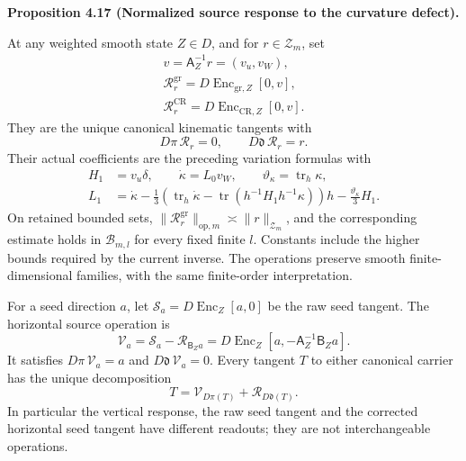 \documentclass[
  english,
  11pt,
  reqno]{amsart}
\makeatletter
\newcommand{\pandocstatementheading}[1]{%
  \par\if@nobreak\else
    \addpenalty{\@beginparpenalty}%
    \addvspace{.5\baselineskip plus .2\baselineskip minus .2\baselineskip}%
  \fi
  {\normalfont\bfseries #1\par}%
  \nobreak\@afterindenttrue\@afterheading
}
\makeatother
\begin{document}
\pandocstatementheading{\leavevmode{}\label{prop:online-source-normalized-vertical-response}Proposition 4.17 (Normalized source response to the curvature defect).}

At any weighted smooth state \(Z\in D\), and for \(r\in\mathcal Z_m\),
set%
 \[
\begin{gathered}
v=\mathsf A_Z^{-1}r=(v_u,v_W), \\
\mathscr R_r^{\mathrm{gr}}
=D\operatorname{Enc}_{\mathrm{gr},Z}[0,v], \\
\mathscr R_r^{\mathrm{CR}}
=D\operatorname{Enc}_{\mathrm{CR},Z}[0,v].
\end{gathered}
\] They are the unique canonical kinematic tangents with%
 \[
D\pi\,\mathscr R_r=0,\qquad
D\mathfrak d\,\mathscr R_r=r.
\] Their actual coefficients are the preceding variation formulas with%
 \[
\begin{aligned}
H_1&=v_u\delta,\qquad \dot\kappa=L_0v_W,
\qquad \vartheta_\kappa=\operatorname{tr}_h\kappa,\\
L_1&=\dot\kappa
-\frac13\left(\operatorname{tr}_h\dot\kappa
-\operatorname{tr}(h^{-1}H_1h^{-1}\kappa)\right)h
-\frac{\vartheta_\kappa}{3}H_1.
\end{aligned}
\] On retained bounded sets,
\(\|\mathscr R_r^{\mathrm{gr}}\|_{\mathrm{op},m}\asymp\|r\|_{\mathcal Z_m}\),
and the corresponding estimate holds in \(\mathcal B_{m,l}\) for every
fixed finite \(l\). Constants include the higher bounds required by the
current inverse. The operations preserve smooth finite-dimensional
families, with the same finite-order interpretation.

For a seed direction \(a\), let
\(\mathscr S_a=D\operatorname{Enc}_Z[a,0]\) be the raw seed tangent. The
horizontal source operation is%
 \[
\mathscr V_a
=\mathscr S_a-\mathscr R_{\mathsf B_Za}
=D\operatorname{Enc}_Z[a,-\mathsf A_Z^{-1}\mathsf B_Za].
\] It satisfies \(D\pi\,\mathscr V_a=a\) and
\(D\mathfrak d\,\mathscr V_a=0\). Every tangent \(T\) to either
canonical carrier has the unique decomposition%
 \[
T=\mathscr V_{D\pi(T)}+\mathscr R_{D\mathfrak d(T)}.
\] In particular the vertical response, the raw seed tangent and the
corrected horizontal seed tangent have different readouts; they are not
interchangeable operations.
\end{document}
